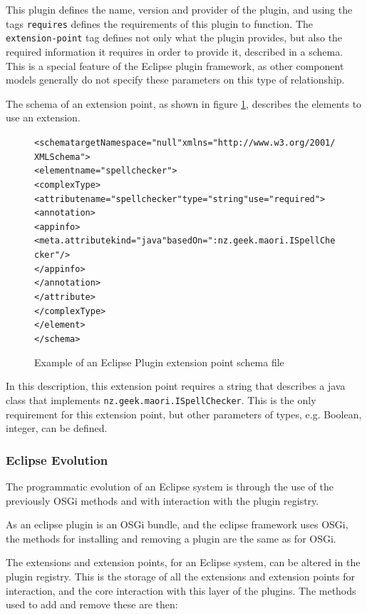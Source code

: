 This plugin defines the name, version and provider of the plugin, and using the tags \verb+requires+ defines the requirements of this plugin to function.
The \verb+extension-point+ tag defines not only what the plugin provides, but also the required information it requires in order to provide it, described in a schema.
This is a special feature of the Eclipse plugin framework, as other component models generally do not specify these parameters on this type of relationship. 

The schema of an extension point, as shown in figure \ref{eclipseextensionschema}, describes the elements to use an extension.

\begin{figure}[htp]
\begin{center}
\begin{alltt}
<schema targetNamespace="null" xmlns="http://www.w3.org/2001/XMLSchema">
 <element name="spellchecker">
  <complexType>
   <attribute name="spellchecker" type="string" use="required">
    <annotation>
     <appinfo>
      <meta.attribute kind="java" basedOn=":nz.geek.maori.ISpellChecker"/>
     </appinfo>
    </annotation>
   </attribute>
  </complexType>
 </element>
</schema>
\end{alltt}
  \caption[Eclipse Plugin extension point schema]{Example of an Eclipse Plugin extension point schema file}
  \label{eclipseextensionschema}
\end{center}
\end{figure}

In this description, this extension point requires a string that describes a java class that implements \verb+nz.geek.maori.ISpellChecker+.
This is the only requirement for this extension point, but other parameters of types, e.g. Boolean, integer, can be defined.

\subsubsection{Eclipse Evolution}
The programmatic evolution of an Eclipse system is through the use of the previously OSGi methods and with interaction with the plugin registry.

As an eclipse plugin is an OSGi bundle, and the eclipse framework uses OSGi, the methods for installing and removing a plugin are the same as for OSGi.

The extensions and extension points, for an Eclipse system, can be altered in the plugin registry.
This is the storage of all the extensions and extension points for interaction, and the core interaction with this layer of the plugins.
The methods used to add and remove these are then:

